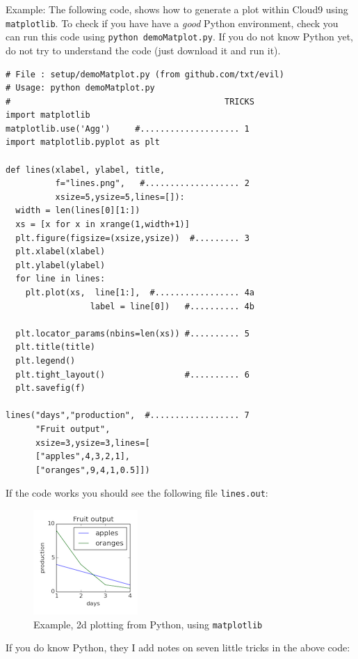 Example: The following code, shows how to generate a plot within Cloud9
using \texttt{matplotlib}. To check if you have have a \emph{good}
Python environment, check you can run this code using
\texttt{python\ demoMatplot.py}. If you do not know Python yet, do not
try to understand the code (just download it and run it).

\newpage

\begin{lstlisting}
# File : setup/demoMatplot.py (from github.com/txt/evil)
# Usage: python demoMatplot.py              
#                                           TRICKS
import matplotlib
matplotlib.use('Agg')     #.................... 1
import matplotlib.pyplot as plt 

def lines(xlabel, ylabel, title,
          f="lines.png",   #................... 2
          xsize=5,ysize=5,lines=[]): 
  width = len(lines[0][1:])
  xs = [x for x in xrange(1,width+1)] 
  plt.figure(figsize=(xsize,ysize))  #......... 3
  plt.xlabel(xlabel)
  plt.ylabel(ylabel) 
  for line in lines: 
    plt.plot(xs,  line[1:],  #................. 4a
                 label = line[0])   #.......... 4b
   
  plt.locator_params(nbins=len(xs)) #.......... 5
  plt.title(title)
  plt.legend()
  plt.tight_layout()                #.......... 6
  plt.savefig(f)

lines("days","production",  #.................. 7
      "Fruit output",
      xsize=3,ysize=3,lines=[
      ["apples",4,3,2,1],
      ["oranges",9,4,1,0.5]])
\end{lstlisting}

If the code works you should see the following file \texttt{lines.out}:

\begin{figure}[htbp]
\centering
\includegraphics{img/matplotlib101.png}
\caption{Example, 2d plotting from Python, using \texttt{matplotlib}}
\end{figure}

If you do know Python, they I add notes on seven little tricks in the
above code:


